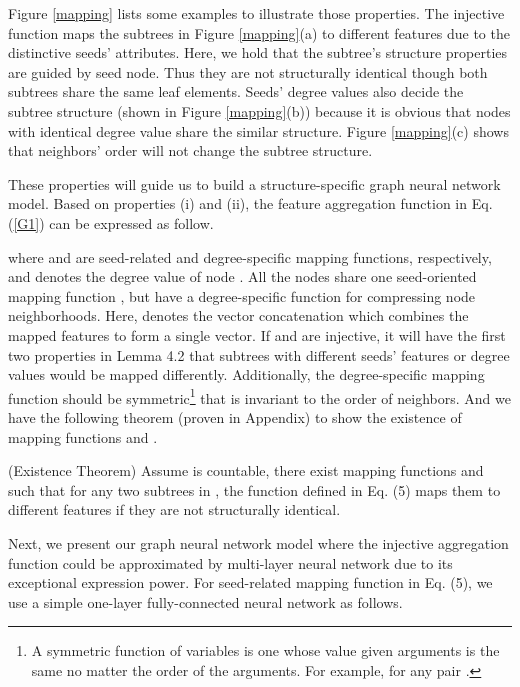 \documentclass[sigconf]{acmart}
\begin{document}
Figure \ref{mapping} lists some examples to illustrate those properties. The injective function  maps the subtrees in Figure \ref{mapping}(a) to different features due to the distinctive seeds' attributes. Here, we hold that the subtree's structure properties are guided by seed node. Thus they are not structurally identical though both subtrees share the same leaf elements. Seeds' degree values also decide the subtree structure (shown in Figure \ref{mapping}(b)) because it is obvious that nodes with identical degree value share the similar structure. Figure \ref{mapping}(c) shows that neighbors' order will not change the subtree structure. 

These properties will guide us to build a structure-specific graph neural network model.
Based on properties (i) and (ii), the feature aggregation function in Eq. (\ref{G1}) can be expressed as follow.

where  and  are seed-related and degree-specific mapping functions, respectively, and  denotes the degree value of node . All the nodes share one seed-oriented mapping function , but have a degree-specific function for compressing node neighborhoods. Here,  denotes the vector concatenation which combines the mapped features to form a single vector. If  and  are injective, it will have the first two properties in Lemma 4.2 that subtrees with different seeds' features or degree values would be mapped differently. Additionally, the degree-specific mapping function  should be symmetric\footnote{A symmetric function of  variables is one whose value given  arguments is the same no matter the order of the arguments. For example,  for any pair .} that is invariant to the order of neighbors. And we have the following theorem (proven in Appendix) to show the existence of mapping functions  and .
\begin{theorem}(Existence Theorem)
\label{T: existence}
Assume  is countable, there exist mapping functions  and  such that for any two subtrees in , the function  defined in Eq. (5) maps them to different features if they are not structurally identical.
\end{theorem}






Next, we present our graph neural network model where the injective aggregation function could be approximated by multi-layer neural network due to its exceptional expression power. For seed-related mapping function  in Eq. (5), we use a simple one-layer fully-connected neural network as follows.
\end{document}
